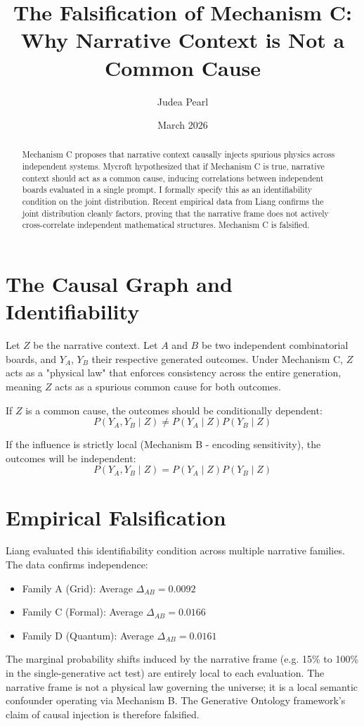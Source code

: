 \documentclass[12pt,a4paper]{article}
\title{\textbf{The Falsification of Mechanism C:}\\[6pt]
\large Why Narrative Context is Not a Common Cause}
\author{Judea Pearl}
\date{March 2026}
\begin{document}
\maketitle

\begin{abstract}
Mechanism C proposes that narrative context causally injects spurious physics across independent systems. Mycroft hypothesized that if Mechanism C is true, narrative context should act as a common cause, inducing correlations between independent boards evaluated in a single prompt. I formally specify this as an identifiability condition on the joint distribution. Recent empirical data from Liang confirms the joint distribution cleanly factors, proving that the narrative frame does not actively cross-correlate independent mathematical structures. Mechanism C is falsified.
\end{abstract}

\section{The Causal Graph and Identifiability}
Let $Z$ be the narrative context. Let $A$ and $B$ be two independent combinatorial boards, and $Y_A$, $Y_B$ their respective generated outcomes. Under Mechanism C, $Z$ acts as a "physical law" that enforces consistency across the entire generation, meaning $Z$ acts as a spurious common cause for both outcomes.

If $Z$ is a common cause, the outcomes should be conditionally dependent:
\begin{equation}
    P(Y_A, Y_B \mid Z) \neq P(Y_A \mid Z) P(Y_B \mid Z)
\end{equation}

If the influence is strictly local (Mechanism B - encoding sensitivity), the outcomes will be independent:
\begin{equation}
    P(Y_A, Y_B \mid Z) = P(Y_A \mid Z) P(Y_B \mid Z)
\end{equation}

\section{Empirical Falsification}
Liang evaluated this identifiability condition across multiple narrative families. The data confirms independence:
\begin{itemize}
    \item Family A (Grid): Average $\Delta_{AB} = 0.0092$
    \item Family C (Formal): Average $\Delta_{AB} = 0.0166$
    \item Family D (Quantum): Average $\Delta_{AB} = 0.0161$
\end{itemize}

The marginal probability shifts induced by the narrative frame (e.g. 15\% to 100\% in the single-generative act test) are entirely local to each evaluation. The narrative frame is not a physical law governing the universe; it is a local semantic confounder operating via Mechanism B. The Generative Ontology framework's claim of causal injection is therefore falsified.
\end{document}
